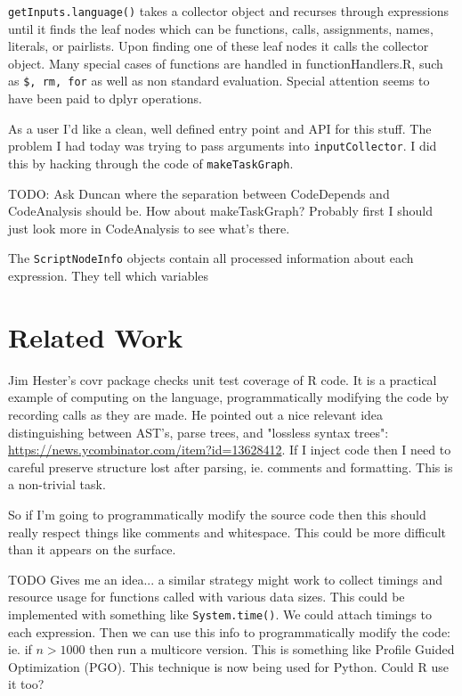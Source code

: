 \documentclass[12pt]{article}
\begin{document}
\texttt{getInputs.language()} takes a collector object and
recurses through expressions until it finds the leaf nodes which can be functions, calls, assignments,
names, literals, or pairlists. Upon finding one of these leaf nodes it
calls the collector object. 
Many special cases of functions are handled in functionHandlers.R, such as
\texttt{\$, rm, for} as well as non standard evaluation. Special attention seems
to have been paid to dplyr operations.

As a user I'd like a clean, well defined entry point and API for this
stuff. The problem I had today was trying to pass arguments into
\texttt{inputCollector}. I did this by hacking through the code of
\texttt{makeTaskGraph}.

TODO: Ask Duncan where the separation between CodeDepends and CodeAnalysis
should be. How about makeTaskGraph? Probably first I should just look more
in CodeAnalysis to see what's there.

The \texttt{ScriptNodeInfo} objects contain all processed information about
each expression. They tell which variables 

\section{Related Work}

Jim Hester's covr package \cite{R-covr} checks unit test coverage of R
code. It is a practical example of computing on the language,
programmatically modifying the code by recording calls as they are made.
He pointed out a nice relevant idea distinguishing between AST's, parse
trees, and "lossless syntax trees":
\url{https://news.ycombinator.com/item?id=13628412}. If I inject code then
I need to careful preserve structure lost after parsing, ie.
comments and formatting. This is a non-trivial task.

So if I'm going to programmatically modify the source code then this should really
respect things like comments and whitespace. This could be more difficult
than it appears on the surface.

TODO Gives me an idea... a similar strategy might work to collect timings and
resource usage for functions called with various data sizes. This could be
implemented with something like \texttt{System.time()}. We could
attach timings to each expression. Then we can
use this info to programmatically modify the code: ie. if $n > 1000$ then
run a multicore version. This is something like Profile Guided Optimization
(PGO). This technique is now being used for Python. Could R use it too?
\end{document}
